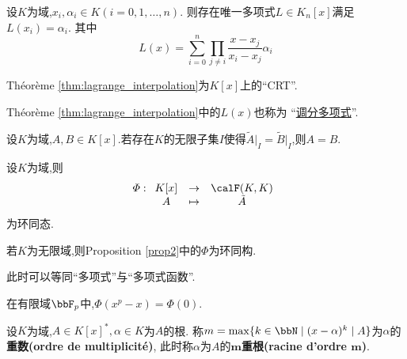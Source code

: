 \begin{thm}[Lagrange插值公式]\label{thm:lagrange_interpolation}
    设$K$为域,$x_i, \alpha_i \in K (i = 0, 1, \ldots, n)$.
    则存在唯一多项式$L \in K_n[x]$满足$L(x_i) = \alpha_i$.
    其中\[ L(x) = \sum\limits_{i = 0}^n \prod\limits_{j \neq i} \dfrac{x - x_j}{x_i - x_j} \alpha_i \]
\end{thm}

\begin{rqq}
    Théorème \ref{thm:lagrange_interpolation}为$K[x]$上的``CRT''.
\end{rqq}

\begin{rqq}
    Théorème \ref{thm:lagrange_interpolation}中的$L(x)$也称为
    ``\href{https://faculty.ustc.edu.cn/yqliang/files/teaching.htm#exam}{调分多项式}''.
\end{rqq}

\begin{prop}
    设$K$为域,$A, B \in K[x]$.若存在$K$的无限子集$I$使得$\tilde{A} \vert_I = \tilde{B} \vert_I$,则$A = B$.
\end{prop}

\begin{prop}\label{prop2}
    设$K$为域,则\[ \varPhi: \begin{array}[t]{ccc} K[x] & \to & \calF(K, K) \\ A & \tp & \tilde{A} \end{array} \]为环同态.
\end{prop}

\begin{rqq}
    若$K$为无限域,则Proposition \ref{prop2}中的$\varPhi$为环同构.
\end{rqq}

\begin{rqq}
    此时可以等同``多项式''与``多项式函数''.
\end{rqq}

\begin{rqq}
    在有限域$\bbF_p$中,$\varPhi(x^p - x) = \varPhi(0)$.
\end{rqq}

\begin{deff}
    设$K$为域,$A \in K[x]^*, \alpha \in K$为$A$的根.
    称$m = \max \{ k \in \bbN \mid (x - \alpha)^k \mid A \}$为$\alpha$的\textbf{重数(ordre de multiplicité)},
    此时称$\alpha$为$A$的\textbf{$\boldsymbol{m}$重根(racine d'ordre $\boldsymbol{m}$)}.
\end{deff}

